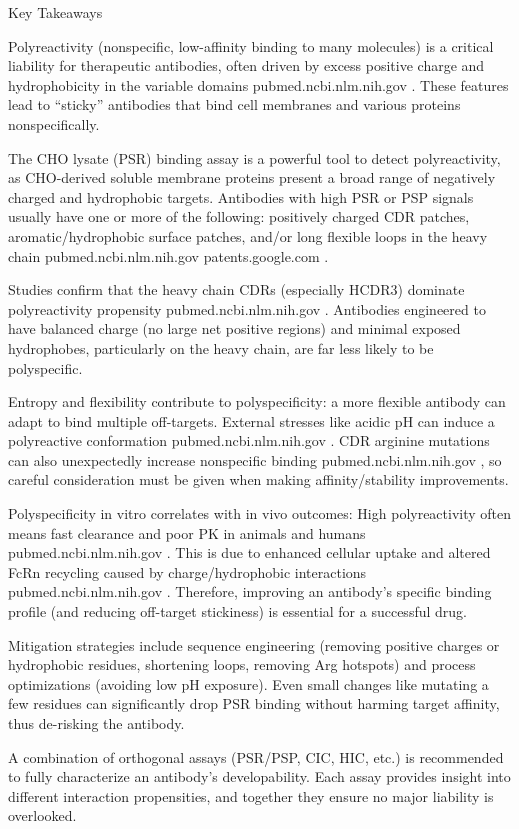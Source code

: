 Key Takeaways

Polyreactivity (nonspecific, low-affinity binding to many molecules) is a critical liability for therapeutic antibodies, often driven by excess positive charge and hydrophobicity in the variable domains
pubmed.ncbi.nlm.nih.gov
. These features lead to “sticky” antibodies that bind cell membranes and various proteins nonspecifically.

The CHO lysate (PSR) binding assay is a powerful tool to detect polyreactivity, as CHO-derived soluble membrane proteins present a broad range of negatively charged and hydrophobic targets. Antibodies with high PSR or PSP signals usually have one or more of the following: positively charged CDR patches, aromatic/hydrophobic surface patches, and/or long flexible loops in the heavy chain
pubmed.ncbi.nlm.nih.gov
patents.google.com
.

Studies confirm that the heavy chain CDRs (especially HCDR3) dominate polyreactivity propensity
pubmed.ncbi.nlm.nih.gov
. Antibodies engineered to have balanced charge (no large net positive regions) and minimal exposed hydrophobes, particularly on the heavy chain, are far less likely to be polyspecific.

Entropy and flexibility contribute to polyspecificity: a more flexible antibody can adapt to bind multiple off-targets. External stresses like acidic pH can induce a polyreactive conformation
pubmed.ncbi.nlm.nih.gov
. CDR arginine mutations can also unexpectedly increase nonspecific binding
pubmed.ncbi.nlm.nih.gov
, so careful consideration must be given when making affinity/stability improvements.

Polyspecificity in vitro correlates with in vivo outcomes: High polyreactivity often means fast clearance and poor PK in animals and humans
pubmed.ncbi.nlm.nih.gov
. This is due to enhanced cellular uptake and altered FcRn recycling caused by charge/hydrophobic interactions
pubmed.ncbi.nlm.nih.gov
. Therefore, improving an antibody’s specific binding profile (and reducing off-target stickiness) is essential for a successful drug.

Mitigation strategies include sequence engineering (removing positive charges or hydrophobic residues, shortening loops, removing Arg hotspots) and process optimizations (avoiding low pH exposure). Even small changes like mutating a few residues can significantly drop PSR binding without harming target affinity, thus de-risking the antibody.

A combination of orthogonal assays (PSR/PSP, CIC, HIC, etc.) is recommended to fully characterize an antibody’s developability. Each assay provides insight into different interaction propensities, and together they ensure no major liability is overlooked.

